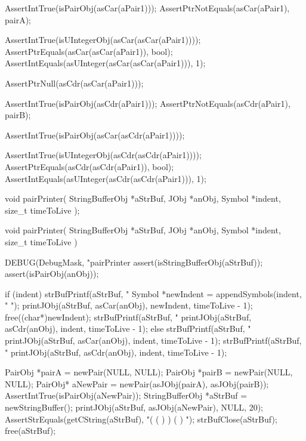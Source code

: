   AssertIntTrue(isPairObj(asCar(aPair1)));
  AssertPtrNotEquals(asCar(aPair1), pairA);

  AssertIntTrue(isUIntegerObj(asCar(asCar(aPair1))));
  AssertPtrEquals(asCar(asCar(aPair1)), bool);
  AssertIntEquals(asUInteger(asCar(asCar(aPair1))), 1);

  AssertPtrNull(asCdr(asCar(aPair1)));

  AssertIntTrue(isPairObj(asCdr(aPair1)));
  AssertPtrNotEquals(asCdr(aPair1), pairB);

  AssertIntTrue(isPairObj(asCar(asCdr(aPair1))));

  AssertIntTrue(isUIntegerObj(asCdr(asCdr(aPair1))));
  AssertPtrEquals(asCdr(asCdr(aPair1)), bool);
  AssertIntEquals(asUInteger(asCdr(asCdr(aPair1))), 1);
\stopCTest
\stopTestCase
\stopTestSuite

\startTestSuite[pairPrinter]

\startCHeader
void pairPrinter(
  StringBufferObj *aStrBuf,
  JObj            *anObj,
  Symbol          *indent,
  size_t          timeToLive
);
\stopCHeader

\startCCode
void pairPrinter(
  StringBufferObj *aStrBuf,
  JObj            *anObj,
  Symbol          *indent,
  size_t           timeToLive
) {
  DEBUG(DebugMask, "pairPrinter %
  assert(isStringBufferObj(aStrBuf));
  assert(isPairObj(anObj));
  
  if (indent) {
    strBufPrintf(aStrBuf, "%
    Symbol *newIndent = appendSymbols(indent, "  ");
    printJObj(aStrBuf, asCar(anObj), newIndent, timeToLive - 1);
    free((char*)newIndent);
    strBufPrintf(aStrBuf, "%
    printJObj(aStrBuf, asCdr(anObj), indent, timeToLive - 1);
  } else {
    strBufPrintf(aStrBuf, "%
    printJObj(aStrBuf, asCar(anObj), indent, timeToLive - 1);
    strBufPrintf(aStrBuf, "%
    printJObj(aStrBuf, asCdr(anObj), indent, timeToLive - 1);
  }
  
}
\stopCCode


\startCTest
  PairObj *pairA = newPair(NULL, NULL);
  PairObj *pairB = newPair(NULL, NULL);
  PairObj* aNewPair = newPair(asJObj(pairA), asJObj(pairB));
  AssertIntTrue(isPairObj(aNewPair));
  StringBufferObj *aStrBuf = newStringBuffer();
  printJObj(aStrBuf, asJObj(aNewPair), NULL, 20);
  AssertStrEquals(getCString(aStrBuf), "( (  )  ) (  )  ");
  strBufClose(aStrBuf);
  free(aStrBuf);
\stopCTest
\stopTestCase
\stopTestSuite

